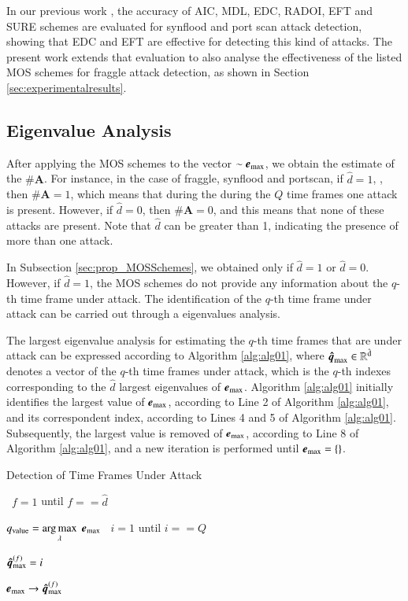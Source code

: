 \documentclass[review]{elsarticle}
\makeatletter
\DeclareMathOperator*{\argmax}{arg\,max}
\newcommand{\ALOOP}[1]{\ALC@it\algorithmicloop\ #1%
  \begin{ALC@loop}}
\newcommand{\ENDALOOP}{\end{ALC@loop}\ALC@it\algorithmicendloop}
\makeatother
\begin{document}
In our previous work \cite{tenorio2013greatest}, the accuracy of AIC, MDL, EDC, RADOI, EFT and SURE schemes are evaluated for synflood and port scan attack detection, showing that EDC and EFT are effective for detecting this kind of attacks. The present work extends that evaluation to also analyse the effectiveness of the listed MOS schemes for fraggle attack detection, as shown in Section \ref{sec:experimentalresults}.

\subsection{Eigenvalue Analysis}
\label{sec:prop_EigenvalueAnalysis}

After applying the MOS schemes to the vector $\sim\boldsymbol{e}_{\rm max}$, we obtain the estimate of the $\#\boldsymbol{A}$. For instance, in the case of fraggle, synflood and portscan, if $\hat{d} = 1$, , then $\#\boldsymbol{A} = 1$, which means that during the during the $Q$ time frames one attack is present. However, if $\hat{d} = 0$, then $\#\boldsymbol{A} = 0$, and this means that none of these attacks are present. Note that $\hat{d}$ can be greater than 1, indicating the presence of more than one attack.

In Subsection \ref{sec:prop_MOSSchemes}, we obtained only if $\hat{d} = 1$ or $\hat{d} = 0$. However, if $\hat{d} = 1$, the MOS schemes do not provide any information about the $q$-th time frame under attack. The identification of the $q$-th time frame under attack can be carried out through a eigenvalues analysis.

The largest eigenvalue analysis for estimating the $q$-th time frames that are under attack can be expressed according to Algorithm \ref{alg:alg01}, where $\rm{\boldsymbol{\hat{q}}}_{\rm max} \in \mathbb{R}^{\hat{d}}$ denotes a vector of the $q$-th time frames under attack, which is the $q$-th indexes corresponding to the $\hat{d}$ largest eigenvalues of $\boldsymbol{e}_{\rm max}$. Algorithm \ref{alg:alg01} initially identifies the largest value of $\boldsymbol{e}_{\rm max}$, according to Line 2 of Algorithm \ref{alg:alg01}, and its correspondent index, according to Lines 4 and 5 of Algorithm \ref{alg:alg01}. Subsequently, the largest value is removed of $\boldsymbol{e}_{\rm max}$, according to Line 8 of Algorithm \ref{alg:alg01}, and a new iteration is performed until $\boldsymbol{e}_{\rm max} = \{\}$.

\begin{algorithm}[h!]
	\caption{Detection of Time Frames Under Attack}
  	\label{alg:alg01}
	\begin{algorithmic}[1]
		\show\LOOP
	    \ALOOP {$f = 1$ until $f == \hat{d}$} 
	    	    \STATE $q_{\rm value} = \argmax\limits_{\lambda}  \hspace{1 mm} \boldsymbol{e}_{\rm max}$
    	    	    \ALOOP {$i = 1$ until $i == Q$} 
				    \STATE $\boldsymbol{\hat{q}}_{\rm max}^{(f)} = i$
				\ENDIF
        		\ENDALOOP
	    		\STATE $\boldsymbol{e}_{\rm max} \rightarrow \boldsymbol{\hat{q}}_{\rm max}^{(f)}$
    		\ENDALOOP
	\end{algorithmic}
\end{algorithm}
\end{document}
